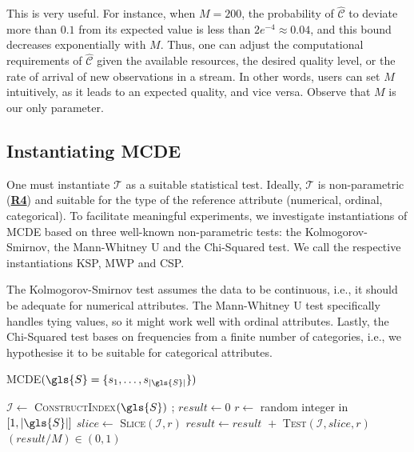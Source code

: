 This is very useful. For instance, when $M=200$, the probability of $\mathcal{\widehat{C}}$ to deviate more than $0.1$ from its expected value is less than $2e^{-4} \approx 0.04$, and this bound decreases exponentially with $M$. Thus, one can adjust the computational requirements of $\mathcal{\widehat{C}}$ given the available resources, the desired quality level, or the rate of arrival of new observations in a stream. In other words, users can set $M$ intuitively, as it leads to an expected quality, and vice versa. Observe that $M$ is our only parameter. 

\subsection{Instantiating \gls{MCDE}}
\label{sec:instantiationMCDE}

One must instantiate $\mathcal{T}$ as a suitable statistical test. Ideally, $\mathcal{T}$ is non-parametric (\hyperlink{R4}{\textbf{R4}}) and suitable for the type of the reference attribute (numerical, ordinal, categorical). To facilitate meaningful experiments, we investigate instantiations  of \gls{MCDE}  based  on  three  well-known  non-parametric  tests: the Kolmogorov-Smirnov, the Mann-Whitney U and  the Chi-Squared test. We call the respective instantiations \gls{KSP}, \gls{MWP} and \gls{CSP}. 

The Kolmogorov-Smirnov test assumes the data to be continuous, i.e., it should be adequate for numerical attributes. 
The Mann-Whitney U test specifically handles tying values, so it might work well with ordinal attributes. 
Lastly, the Chi-Squared test bases on frequencies from a finite number of categories, i.e., we hypothesise it to be suitable for categorical attributes.
\begin{algorithm}\footnotesize
	\caption{\textsc{\gls{MCDE}}$(\gls{S} = \{s_1, \dots, s_{|\gls{S}|}\})$}\label{MCDE_alg}
	\begin{algorithmic}[1]
		\State $\mathcal{I} \gets$ \textsc{ConstructIndex}{$\left(\gls{S}\right)$} ; $\textit{result} \gets 0$ \label{MCDE_alg:line1}
		\State $r \gets$ random integer in $\left[ 1,|\gls{S}| \right]$ 
		\State $slice \gets$ \textsc{Slice}{$\left(\mathcal{I}, r \right)$} \label{MCDE_alg:line4}
		\State $\textit{result} \gets \textit{result } +$ \textsc{Test}{$\left( \mathcal{I} , slice, r \right)$} \label{MCDE_alg:line5}
		\EndFor
		 $(\textit{result} / M) \in (0,1)$
	\end{algorithmic}
\end{algorithm}

